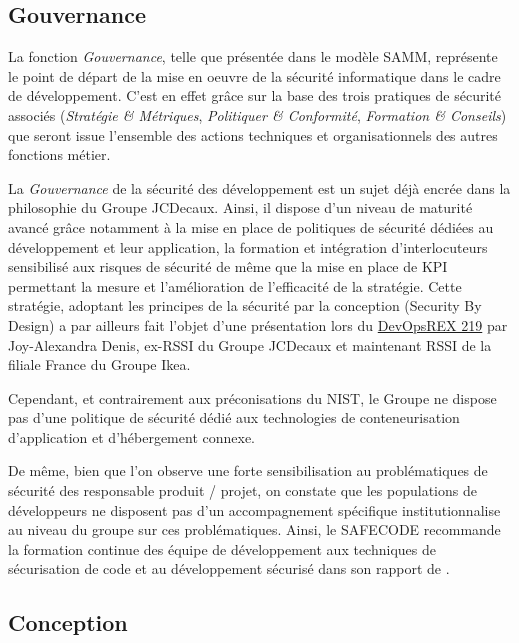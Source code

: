 \subsection{Gouvernance}

La fonction \emph{Gouvernance}, telle que présentée dans le modèle \ac{SAMM}, représente le point de départ de la 
mise en oeuvre de la sécurité informatique dans le cadre de développement. C'est en effet grâce sur la base des 
trois pratiques de sécurité associés (\emph{Stratégie \& Métriques}, \emph{Politiquer \& Conformité}, 
\emph{Formation \& Conseils}) que seront issue l'ensemble des actions techniques et organisationnels des autres
fonctions métier.

La \emph{Gouvernance} de la sécurité des développement est un sujet déjà encrée dans la philosophie du Groupe JCDecaux.
Ainsi, il dispose d'un niveau de maturité avancé grâce notamment à la mise en place de politiques de sécurité dédiées
au développement et leur application, la formation et intégration d'interlocuteurs sensibilisé aux risques de sécurité
de même que la mise en place de \ac{KPI} permettant la mesure et l'amélioration de l'efficacité de la stratégie.
Cette stratégie, adoptant les principes de la sécurité par la conception (Security By Design) a par ailleurs fait 
l'objet d'une présentation\autocite{devopsrex_denis_2019} lors du \href{https://2019.devopsrex.fr/}{DevOpsREX 219} 
par Joy-Alexandra Denis, ex-RSSI du Groupe JCDecaux et maintenant RSSI de la filiale France du Groupe Ikea.

Cependant, et contrairement aux préconisations du \ac{NIST}\autocite*{app_cont_sec_nist_2017}, le Groupe ne dispose pas
d'une politique de sécurité dédié aux technologies de conteneurisation d'application et d'hébergement connexe. 

De même, bien que l'on observe une forte sensibilisation au problématiques de sécurité des responsable produit / projet, 
on constate que les populations de développeurs ne disposent pas d'un accompagnement spécifique institutionnalise au niveau
du groupe sur ces problématiques.
\newline Ainsi, le \ac{SAFECODE} recommande la formation continue des équipe de développement aux techniques de sécurisation
de code et au développement sécurisé dans son rapport  de 
.

\newpage

\subsection{Conception}

